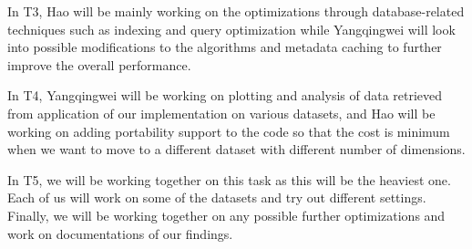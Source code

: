 
\bit
    \item In T3, Hao will be mainly working on the optimizations through database-related techniques such as indexing and query optimization while Yangqingwei will look into possible modifications to the algorithms and metadata caching to further improve the overall performance.
    \item In T4, Yangqingwei will be working on plotting and analysis of data retrieved from application of our implementation on various datasets, and Hao will be working on adding portability support to the code so that the cost is minimum when we want to move to a different dataset with different number of dimensions.
    \item In T5, we will be working together on this task as this will be the heaviest one. Each of us will work on some of the datasets and try out different settings. Finally, we will be working together on any possible further optimizations and work on documentations of our findings.
\eit